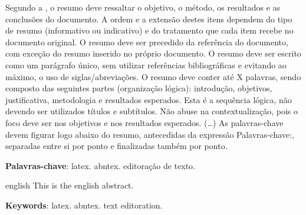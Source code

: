 \documentclass[
	10pt,				%
	openright,			%
	twoside,			%
	a4paper,			%
	chapter=TITLE,		%
	english,			%
	brazil				%
	]{abntex2}
\begin{document}
\setlength{\absparsep}{18pt} %
\begin{resumo}
 Segundo a , o resumo deve ressaltar o
 objetivo, o método, os resultados e as conclusões do documento. A ordem e a extensão
 destes itens dependem do tipo de resumo (informativo ou indicativo) e do
 tratamento que cada item recebe no documento original. O resumo deve ser
 precedido da referência do documento, com exceção do resumo inserido no
 próprio documento. O resumo deve ser escrito como um parágrafo único, sem utilizar referências bibliográficas e evitando ao máximo, o uso de siglas/abreviações. O resumo deve conter até X palavras, sendo composto das seguintes partes (organização lógica): introdução, objetivos, justificativa, metodologia e resultados esperados. Esta é a sequência lógica, não devendo ser utilizados títulos e subtítulos. Não abuse na contextualização, pois o foco deve ser nos objetivos e nos resultados esperados. (\ldots) As palavras-chave devem figurar logo abaixo do
 resumo, antecedidas da expressão Palavras-chave:, separadas entre si por
 ponto e finalizadas também por ponto.

 \textbf{Palavras-chave}: latex. abntex. editoração de texto.
\end{resumo}

\begin{resumo}[Abstract]
 \begin{otherlanguage*}{english}
   This is the english abstract.

   \vspace{\onelineskip}
 
   \noindent 
   \textbf{Keywords}: latex. abntex. text editoration.
 \end{otherlanguage*}
\end{resumo}


\listoffigures*
\cleardoublepage
\listoftables*
\cleardoublepage

\begin{KeepFromToc}
\lstlistoflistings
\end{KeepFromToc}
\cleardoublepage
\end{document}
